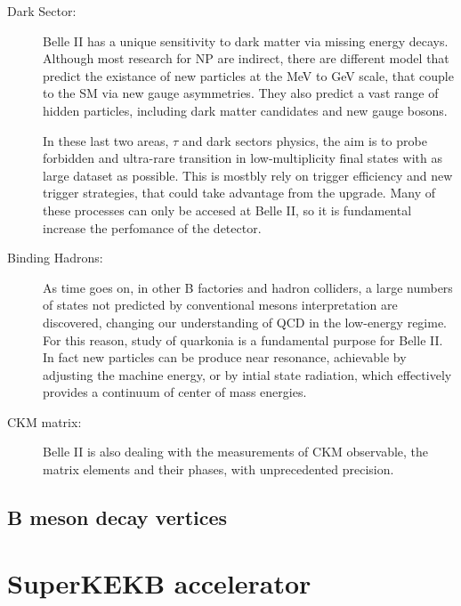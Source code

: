 \begin{description}
\item[Dark Sector:] Belle II has a unique sensitivity to dark matter via missing energy decays. Although most research for NP are indirect, there are different model that predict the existance of new particles at the MeV to GeV scale, that couple to the SM via new gauge asymmetries. They also predict a vast range of hidden particles, including dark matter candidates and new gauge bosons.

In these last two areas, $\tau$ and dark sectors physics, the aim is to probe forbidden and ultra-rare transition in low-multiplicity final states with as large dataset as possible. This is mostbly rely on trigger efficiency and new trigger strategies, that could take advantage from the upgrade. Many of these processes can only be accesed at Belle II, so it is fundamental increase the perfomance of the detector.

\item[Binding Hadrons:] As time goes on, in other B factories and hadron colliders, a large numbers of states not predicted by conventional mesons interpretation are discovered, changing our understanding of QCD in the low-energy regime. For this reason, study of quarkonia is a fundamental purpose for Belle II. In fact new particles can be produce near resonance, achievable by adjusting the machine energy, or by intial state radiation, which effectively provides a continuum of center of mass energies. 

\item[CKM matrix:] Belle II is also dealing with the measurements of CKM observable, the matrix elements and their phases, with unprecedented precision. 

\end{description}


\subsection{B meson decay vertices}




\newpage





\section{SuperKEKB accelerator}

